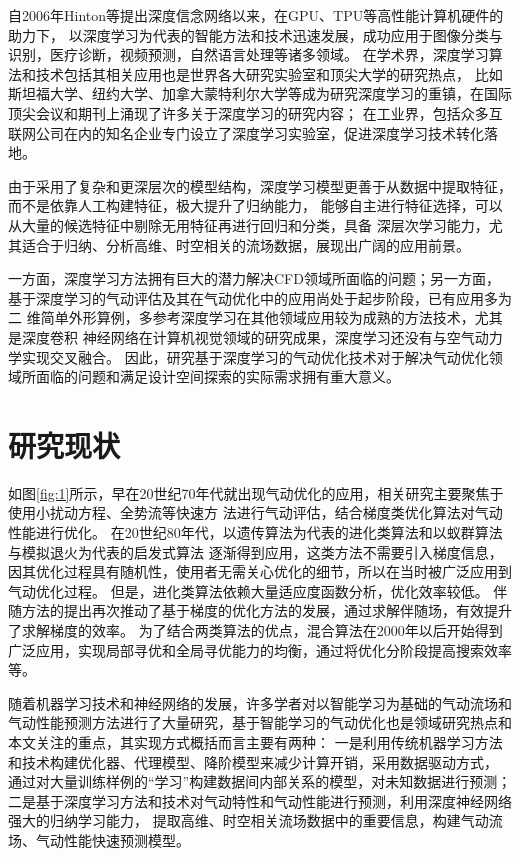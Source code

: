 自2006年Hinton等提出深度信念网络\cite{深度信念网络}以来，在GPU、TPU等高性能计算机硬件的助力下，
以深度学习为代表的智能方法和技术迅速发展，成功应用于图像分类与识别，医疗诊断，视频预测，自然语言处理等诸多领域。
在学术界，深度学习算法和技术包括其相关应用也是世界各大研究实验室和顶尖大学的研究热点，
比如斯坦福大学、纽约大学、加拿大蒙特利尔大学等成为研究深度学习的重镇，在国际顶尖会议和期刊上涌现了许多关于深度学习的研究内容；
在工业界，包括众多互联网公司在内的知名企业专门设立了深度学习实验室，促进深度学习技术转化落地。

由于采用了复杂和更深层次的模型结构，深度学习模型更善于从数据中提取特征，而不是依靠人工构建特征，极大提升了归纳能力，
能够自主进行特征选择，可以从大量的候选特征中剔除无用特征再进行回归和分类，具备
深层次学习能力，尤其适合于归纳、分析高维、时空相关的流场数据，展现出广阔的应用前景。

一方面，深度学习方法拥有巨大的潜力解决CFD领域所面临的问题；另一方面，
基于深度学习的气动评估及其在气动优化中的应用尚处于起步阶段，已有应用多为二
维简单外形算例，多参考深度学习在其他领域应用较为成熟的方法技术，尤其是深度卷积
神经网络在计算机视觉领域的研究成果，深度学习还没有与空气动力学实现交叉融合。
因此，研究基于深度学习的气动优化技术对于解决气动优化领域所面临的问题和满足设计空间探索的实际需求拥有重大意义。



\section{研究现状}
如图\ref{fig:1}所示，早在20世纪70年代就出现气动优化的应用，相关研究主要聚焦于使用小扰动方程、全势流等快速方
法进行气动评估\cite{70年代1,70年代2}，结合梯度类优化算法对气动性能进行优化。
在20世纪80年代，以遗传算法为代表的进化类算法和以蚁群算法与模拟退火为代表的启发式算法
逐渐得到应用\cite{2000Aerodynamic,Genetic,Obayashi1995Genetic}，这类方法不需要引入梯度信息，因其优化过程具有随机性，使用者无需关心优化的细节，所以在当时被广泛应用到气动优化过程。
但是，进化类算法依赖大量适应度函数分析，优化效率较低。
伴随方法\cite{Jameson2000Aerodynamic}的提出再次推动了基于梯度的优化方法的发展，通过求解伴随场，有效提升了求解梯度的效率。
为了结合两类算法的优点，混合算法在2000年以后开始得到广泛应用，实现局部寻优和全局寻优能力的均衡，通过将优化分阶段提高搜索效率等。

随着机器学习技术和神经网络的发展，许多学者对以智能学习为基础的气动流场和气动性能预测方法进行了大量研究，基于智能学习的气动优化也是领域研究热点和本文关注的重点，其实现方式概括而言主要有两种：
一是利用传统机器学习方法和技术构建优化器、代理模型、降阶模型来减少计算开销，采用数据驱动方式，
通过对大量训练样例的“学习”构建数据间内部关系的模型，对未知数据进行预测；
二是基于深度学习方法和技术对气动特性和气动性能进行预测，利用深度神经网络强大的归纳学习能力，
提取高维、时空相关流场数据中的重要信息，构建气动流场、气动性能快速预测模型。

